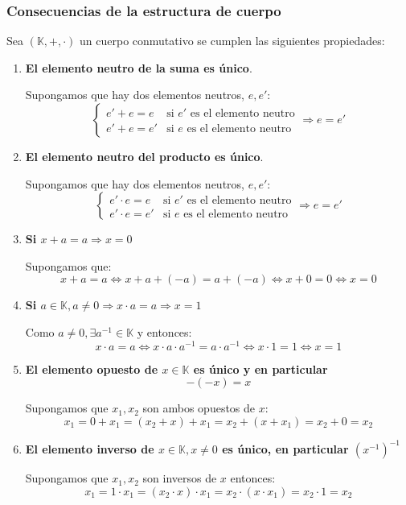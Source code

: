 \documentclass[10pt,a4paper,openright]{book}
\begin{document}
\subsubsection*{Consecuencias de la estructura de cuerpo}
Sea $(\mathbb K, +, \cdot)$ un cuerpo conmutativo se cumplen las siguientes propiedades:
\begin{enumerate}
\item \textbf{El elemento neutro de la suma es único}.\par
 Supongamos que hay dos elementos neutros, $e, e'$:
 \begin{equation*}
 \begin{cases}
 e'+e=e & \mbox{si } e'\mbox{ es el elemento neutro} \\
 e'+e=e' & \mbox{si } e \mbox{ es el elemento neutro}
 \end{cases}
 \Rightarrow e=e'
 \end{equation*}
\item \textbf{El elemento neutro del producto es único}.\par
 Supongamos que hay dos elementos neutros, $e, e'$:
 \begin{equation*}
 \begin{cases}
 e'\cdot e=e & \mbox{si } e'\mbox{ es el elemento neutro} \\
 e'\cdot e=e' & \mbox{si } e \mbox{ es el elemento neutro}
 \end{cases}
 \Rightarrow e=e'
 \end{equation*}
 
\item \textbf{Si $x+a=a\Rightarrow x=0$}\par
 Supongamos que:
 $$x+a=a\Leftrightarrow x+a+(-a)=a+(-a)\Leftrightarrow x+0=0 \Leftrightarrow x=0$$
 
\item \textbf{Si $a\in \mathbb K , a\neq 0\Rightarrow x\cdot a=a\Rightarrow x=1$}\par
 Como $a\neq 0, \exists a^{-1}\in \mathbb K$ y entonces:
$$x\cdot a=a \Leftrightarrow x\cdot a \cdot a^{-1}=a\cdot a^{-1}\Leftrightarrow x\cdot 1=1 \Leftrightarrow x=1$$

\item \textbf{El elemento opuesto de $x\in \mathbb K$ es único y en particular $$-(-x)=x$$}\par
 Supongamos que $x_1, x_2$ son ambos opuestos de $x$:
 $$x_1=0+x_1=(x_2+x)+x_1=x_2+(x+x_1)=x_2+0=x_2$$

\item \textbf{El elemento inverso de $x\in \mathbb K , x\neq 0$ es único, en particular $(x^{-1})^{-1}$}\par
 Supongamos que $x_1, x_2$ son inversos de $x$ entonces:
 $$x_1=1\cdot x_1=(x_2\cdot x)\cdot x_1=x_2\cdot (x\cdot x_1)=x_2\cdot 1=x_2$$
 

\end{enumerate}
\end{document}
